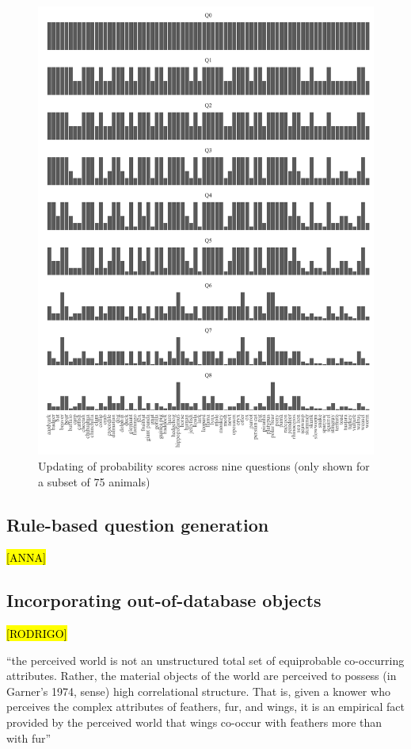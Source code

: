 \documentclass[11pt,a4paper]{article}
\begin{document}
\begin{figure}
	\includegraphics[width=\linewidth]{graphics/updating.pdf}
	\caption{Updating of probability scores across nine questions (only shown for a subset of 75 animals)}
	\label{fig:bayesian-update}
\end{figure}

\subsection{Rule-based question generation}
\label{subsec:qg}

\hl{[ANNA]}


\subsection{Incorporating out-of-database objects}
\label{subsec:out-of-db}

\hl{[RODRIGO]}

``the perceived world is not an unstructured total set of equiprobable co-occurring attributes. Rather, the material objects of the world are perceived to possess (in Garner's 1974, sense) high correlational structure.
That is, given a knower who perceives the complex attributes of feathers, fur, and wings, it is an empirical fact provided by the perceived world that wings co-occur with feathers more than with fur'' \citep[29]{Rosch1978}
\end{document}
